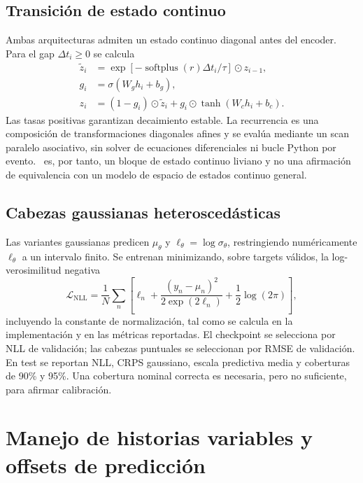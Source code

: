 \subsection{Transición de estado continuo \CTSSM}
\label{sec:ctssm}

Ambas arquitecturas admiten un estado continuo diagonal antes del encoder. Para el gap $\Delta t_i\geq0$ se calcula
\begin{align}
    \widetilde z_i &= \exp\!\left[-\operatorname{softplus}(r)\Delta t_i/\tau\right]\odot z_{i-1},\\
    g_i &= \sigma(W_g h_i+b_g),\\
    z_i &= (1-g_i)\odot\widetilde z_i+g_i\odot\tanh(W_c h_i+b_c).
\end{align}
Las tasas positivas garantizan decaimiento estable. La recurrencia es una composición de transformaciones diagonales afines y se evalúa mediante un scan paralelo asociativo, sin solver de ecuaciones diferenciales ni bucle Python por evento. \CTSSM\ es, por tanto, un bloque de estado continuo liviano y no una afirmación de equivalencia con un modelo de espacio de estados continuo general.

\subsection{Cabezas gaussianas heteroscedásticas}
\label{sec:cabezas-gaussianas}

Las variantes gaussianas predicen $\mu_\theta$ y $\ell_\theta=\log\sigma_\theta$, restringiendo numéricamente $\ell_\theta$ a un intervalo finito. Se entrenan minimizando, sobre targets válidos, la log-verosimilitud negativa
\begin{equation}
    \mathcal{L}_{\mathrm{NLL}}=
    \frac{1}{N}\sum_n\left[
    \ell_n+\frac{(y_n-\mu_n)^2}{2\exp(2\ell_n)}
    +\frac{1}{2}\log(2\pi)
    \right],
\end{equation}
incluyendo la constante de normalización, tal como se calcula en la implementación y en las métricas reportadas. El checkpoint se selecciona por NLL de validación; las cabezas puntuales se seleccionan por RMSE de validación. En test se reportan NLL, CRPS gaussiano, escala predictiva media y coberturas de 90\% y 95\%. Una cobertura nominal correcta es necesaria, pero no suficiente, para afirmar calibración.

\section{Manejo de historias variables y offsets de predicción}
\label{sec:historias-y-offsets}

